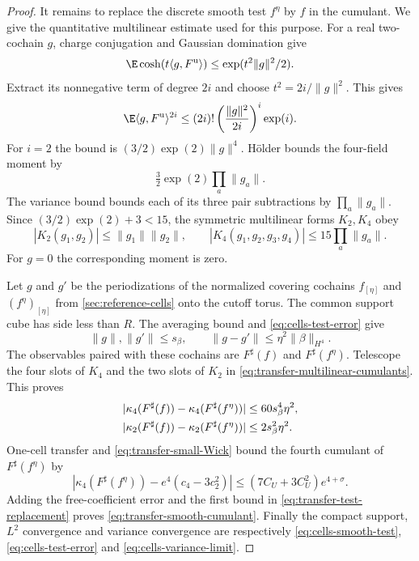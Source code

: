 \begin{proof}
It remains to replace the discrete smooth test
$f^\eta$ by $f$ in the cumulant. We give the
quantitative multilinear estimate used for this purpose.
For a real two-cochain $g$, charge conjugation and
Gaussian domination give
\[
 \E\cosh(t\langle g,F^{\mathrm u}\rangle)
                          \le\exp(t^2\|g\|^2/2).
\]
Extract its nonnegative term of degree $2i$ and choose
$t^2=2i/\|g\|^2$. This gives
\[
 \E\langle g,F^{\mathrm u}\rangle^{2i}
    \le(2i)!\left(\frac{\|g\|^2}{2i}\right)^i \exp(i).
\]
For $i=2$ the bound is $(3/2)\exp(2)\|g\|^4$.
H\"older bounds the four-field moment by
\[
 \tfrac32\exp(2)\prod_a\|g_a\|.
\]
The variance bound bounds each of its three pair subtractions
by $\prod_a\|g_a\|$. Since $(3/2)\exp(2)+3<15$,
the symmetric multilinear forms $K_2,K_4$ obey
\begin{equation}\label{eq:transfer-multilinear-cumulants}
 |K_2(g_1,g_2)|\le\|g_1\|\|g_2\|,\qquad
 |K_4(g_1,g_2,g_3,g_4)|\le15\prod_a\|g_a\|.
\end{equation}
For $g=0$ the corresponding moment is zero.

Let $g$ and $g'$ be the periodizations of the normalized
covering cochains $f_{[\eta]}$ and $(f^\eta)_{[\eta]}$
from \cref{sec:reference-cells} onto the cutoff torus.
The common support cube has side less than $R$.
The averaging bound and \eqref{eq:cells-test-error} give
\[
 \|g\|,\|g'\|\le s_\beta,\qquad
 \|g-g'\|\le\eta^2\|\beta\|_{H^4}.
\]
The observables paired with these cochains are
$F^\sharp(f)$ and $F^\sharp(f^\eta)$.
Telescope the four slots of $K_4$ and the two slots
of $K_2$ in \eqref{eq:transfer-multilinear-cumulants}.
This proves
\begin{align}
 |\kappa_4(F^\sharp(f))-\kappa_4(F^\sharp(f^\eta))|
                              &\le60s_\beta^4\eta^2,\notag\\
 |\kappa_2(F^\sharp(f))-\kappa_2(F^\sharp(f^\eta))|
                              &\le2s_\beta^2\eta^2.
                                   \label{eq:transfer-test-replacement}
\end{align}
One-cell transfer and \eqref{eq:transfer-small-Wick}
bound the fourth cumulant of $F^\sharp(f^\eta)$ by
\[
 |\kappa_4(F^\sharp(f^\eta))-e^4(c_4-3c_2^2)|
                     \le(7C_U+3C_U^2)e^{4+\sigma}.
\]
Adding the free-coefficient error and the first bound
in \eqref{eq:transfer-test-replacement} proves
\eqref{eq:transfer-smooth-cumulant}.
Finally the compact support, $L^2$ convergence and
variance convergence are respectively
\eqref{eq:cells-smooth-test}, \eqref{eq:cells-test-error}
and \eqref{eq:cells-variance-limit}.
\end{proof}


